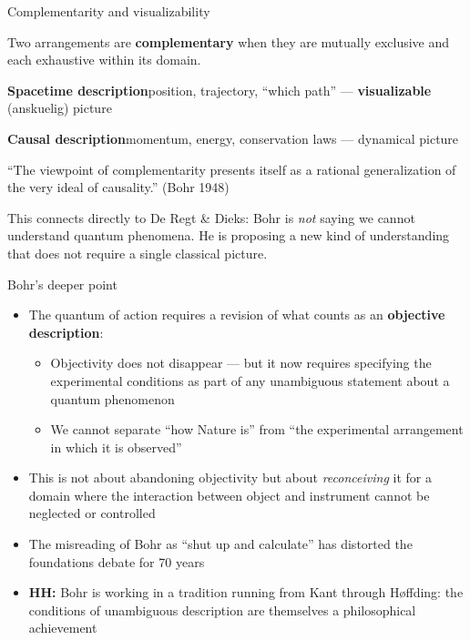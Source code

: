 \documentclass[fleql]{beamer}
\newcommand{\kw}[1]{\textbf{#1}}
\begin{document}
\begin{frame}{Complementarity and visualizability}

  Two arrangements are \kw{complementary} when they are mutually
  exclusive and each exhaustive within its domain.

  \vspace{0.5em}
  \textbf{Spacetime description}\enspace position, trajectory,
  ``which path'' --- \kw{visualizable} (anskuelig) picture

  \medskip

  \textbf{Causal description}\enspace momentum, energy,
  conservation laws --- dynamical picture

  \vspace{0.5em}
  ``The viewpoint of complementarity presents itself as a rational
  generalization of the very ideal of causality.'' (Bohr 1948)

  \vspace{0.3em}
  \small This connects directly to De Regt \& Dieks: Bohr is
  \emph{not} saying we cannot understand quantum phenomena. He
  is proposing a new kind of understanding that does not require
  a single classical picture.

\end{frame}

\begin{frame}{Bohr's deeper point}

  \begin{itemize}
  \item The quantum of action requires a revision of what counts
    as an \kw{objective description}:
    \begin{itemize}
    \item Objectivity does not disappear --- but it now requires
      specifying the experimental conditions as part of any
      unambiguous statement about a quantum phenomenon
    \item We cannot separate ``how Nature is'' from ``the
      experimental arrangement in which it is observed''
    \end{itemize}
  \item This is not about abandoning objectivity but about
    \emph{reconceiving} it for a domain where the interaction
    between object and instrument cannot be neglected or controlled
  \item The misreading of Bohr as ``shut up and calculate'' has
    distorted the foundations debate for 70 years
  \item \textbf{HH:} Bohr is working in a tradition running
    from Kant through H\o ffding: the conditions of unambiguous
    description are themselves a philosophical achievement
  \end{itemize}

\end{frame}
\end{document}
